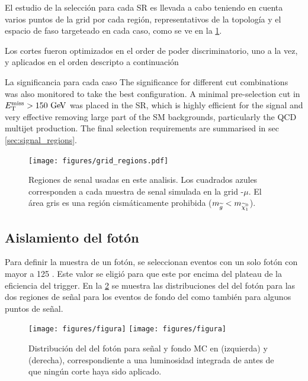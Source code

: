 El estudio de la selección para cada SR es llevada a cabo teniendo en cuenta
varios puntos de la grid por cada región, representativos de la topología y el
espacio de faso targeteado en cada caso, como se ve en la \cref{fig:SRegions}.

Los cortes fueron optimizados en el order de poder discriminatorio, uno a la vez, y aplicados
en el orden descripto a continuación

La significancia para cada caso
The significance for different cut combinations was also monitored to take the best configuration.
A minimal pre-selection cut in $\met>150\gev$ was placed in the SR, which is highly efficient for the signal and very effective
removing large part of the SM backgrounds, particularly the QCD multijet production. The final selection requirements are summarised in sec \ref{sec:signal_regions}.

\begin{figure}[h!]
  \centering
  \texttt{[image: figures/grid\_regions.pdf]}
  \caption{Regiones de senal usadas en este analisis.
    Los cuadrados azules corresponden a cada muestra de senal simulada en la
    grid -$\mu$.
    El área gris es una región cismáticamente prohibida ($m_{\gluino}<m_{\ninoone}$).}\label{fig:SRegions}
\end{figure}

\subsection{Aislamiento del fotón}\label{sec:opt_ph_iso}

Para definir la muestra de un fotón, se seleccionan eventos con un solo
fotón con {\pt} mayor a 125 \gev. Este valor se eligió para que este por
encima del plateau de la eficiencia del trigger. En la \cref{fig:photon_pt}
se muestra las distribuciones del {\pt} del fotón para las dos regiones
de señal para los eventos de fondo del {\SM} como también para algunos puntos
de señal.

\begin{figure}[bh!]
  \centering
  \texttt{[image: figures/figura]} %
  \texttt{[image: figures/figura]} %
  \caption{Distribución del {\pt} del fotón para señal y fondo MC en {\SRL} (izquierda) y
    {\SRH} (derecha), correspondiente a una luminosidad integrada de {\ilumi} antes de que ningún
    corte haya sido aplicado. }
  \label{fig:photon_pt}
\end{figure}

